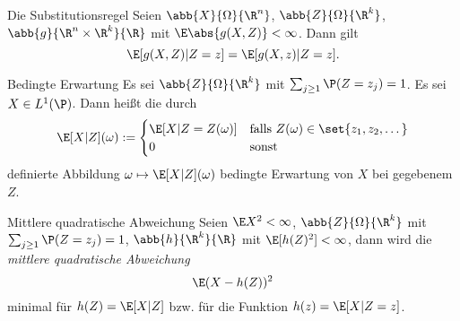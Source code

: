 \begin{karte}{Die Substitutionsregel}
	Seien $\abb{X}{\Omega}{\R^n}$, $\abb{Z}{\Omega}{\R^k}$, $\abb{g}{\R^n \times \R^k}{\R}$ 
	mit $\E \abs{g(X,Z)} < \infty$. Dann gilt
	$$\E[g(X,Z)|Z=z]=\E[g(X,z)|Z=z].$$
\end{karte}

\begin{karte}{Bedingte Erwartung}
	Es sei $\abb{Z}{\Omega}{\R^k}$ mit $\sum_{j \geq 1} \P(Z=z_j) = 1$. Es sei $X \in L^1(\P)$. 
	Dann heißt die durch
	$$\E[X|Z](\omega) := \begin{cases}
	\E[X|Z=Z(\omega)] & \text{falls } Z(\omega) \in \set{z_1,z_2,\dotsc} \\
	0 & \text{sonst}
	\end{cases}$$
	definierte Abbildung $\omega \mapsto \E[X|Z](\omega)$ bedingte Erwartung von $X$ bei gegebenem $Z$.
\end{karte}

\begin{karte}{Mittlere quadratische Abweichung}
	Seien $\E X^2 < \infty$, $\abb{Z}{\Omega}{\R^k}$  mit $\sum_{j \geq 1} \P(Z=z_j) = 1$,
	 $\abb{h}{\R^k}{\R}$ mit $\E [h(Z)^2] < \infty$, dann wird die \textit{mittlere quadratische Abweichung} 
	$$ \E(X-h(Z))^2$$ minimal für $h(Z)=\E[X|Z]$ bzw. für die Funktion $h(z)=\E[X|Z=z]$.
\end{karte}